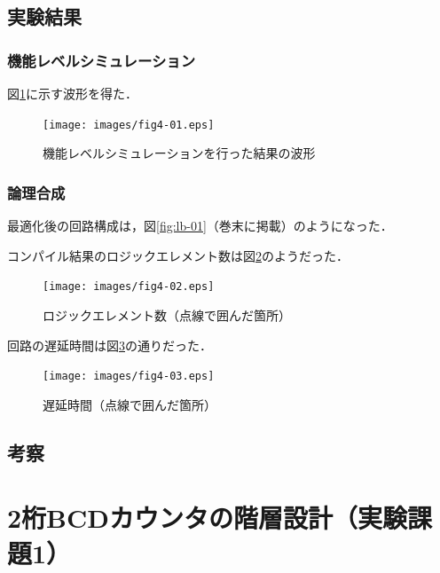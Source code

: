 \documentclass[uplatex]{jsarticle}
\begin{document}
\subsection{実験結果}

\subsubsection{機能レベルシミュレーション}

図\ref{fig:4-01}に示す波形を得た．

\begin{figure}[htb]
  \begin{center}
    \texttt{[image: images/fig4-01.eps]}
    \caption{機能レベルシミュレーションを行った結果の波形}
    \label{fig:4-01}
  \end{center}
\end{figure}

\subsubsection{論理合成}

最適化後の回路構成は，図\ref{fig:lb-01}（巻末に掲載）のようになった．

コンパイル結果のロジックエレメント数は図\ref{fig:4-02}のようだった． 

\begin{figure}[htb]
  \begin{center}
    \texttt{[image: images/fig4-02.eps]}
    \caption{ロジックエレメント数（点線で囲んだ箇所）}
    \label{fig:4-02}
  \end{center}
\end{figure}

回路の遅延時間は図\ref{fig:4-03}の通りだった．

\begin{figure}[htb]
  \begin{center}
    \texttt{[image: images/fig4-03.eps]}
    \caption{遅延時間（点線で囲んだ箇所）}
    \label{fig:4-03}
  \end{center}
\end{figure}

\subsection{考察}

\clearpage

\section{2桁BCDカウンタの階層設計（実験課題1）}
\end{document}
